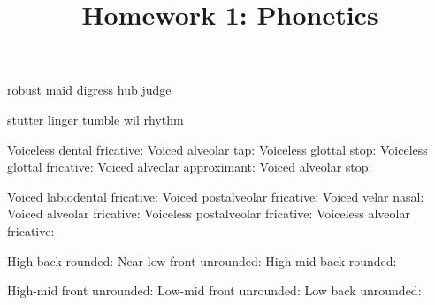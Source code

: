 \documentclass[addpoints]{exam}
\title{Homework 1: Phonetics}
\date{}
\begin{document}
  \maketitle

  


  \begin{questions}
      \parbox[t]{0.45\linewidth}{
        \question[1] robust \hrulefill
        \question[1] maid \hrulefill
        \question[1] digress \hrulefill
        \question[1] hub \hrulefill
        \question[1] judge \hrulefill
      }
      \hspace{0.1\linewidth}
      \parbox[t]{0.45\linewidth}{
        \question[1] stutter \hrulefill
        \question[1] linger \hrulefill
        \question[1] tumble \hrulefill
        \question[1] wil \hrulefill
        \question[1] rhythm \hrulefill
      }

      \parbox[t]{0.45\linewidth}{
        \question[1] Voiceless dental fricative: \hrulefill
        \question[1] Voiced alveolar tap: \hrulefill
        \question[1] Voiceless glottal stop: \hrulefill
        \question[1] Voiceless glottal fricative: \hrulefill
        \question[1] Voiced alveolar approximant: \hrulefill
        \question[1] Voiced alveolar stop: \hrulefill
      }
      \hspace{0.1\linewidth}
      \parbox[t]{0.45\linewidth}{
        \question[1] Voiced labiodental fricative: \hrulefill
        \question[1] Voiced postalveolar fricative: \hrulefill
        \question[1] Voiced velar nasal: \hrulefill
        \question[1] Voiced alveolar fricative: \hrulefill
        \question[1] Voiceless postalveolar fricative: \hrulefill
        \question[1] Voiceless alveolar fricative: \hrulefill
      }

      \parbox[t]{0.45\linewidth}{
        \question[1] High back rounded: \hrulefill
        \question[1] Near low front unrounded: \hrulefill
        \question[1] High-mid back rounded: \hrulefill
      }
      \hspace{0.1\linewidth}
      \parbox[t]{0.45\linewidth}{
        \question[1] High-mid front unrounded: \hrulefill
        \question[1] Low-mid front unrounded: \hrulefill
        \question[1] Low back unrounded: \hrulefill
      }


\end{questions}
\end{document}

